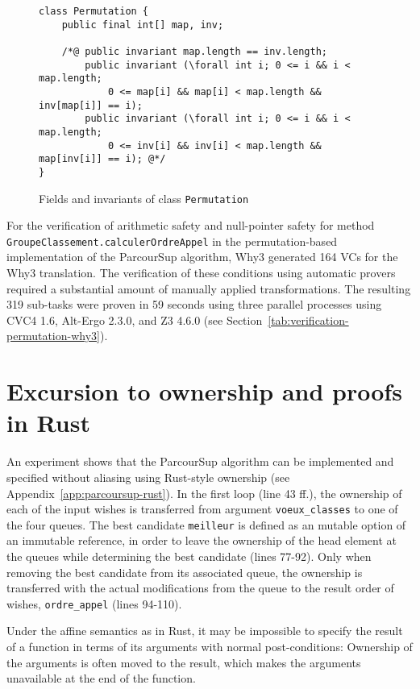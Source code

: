 \documentclass[a4paper]{report}
\newcommand{\cref}[1]{Section~\ref{#1}}
\newcommand{\aref}[1]{Appendix~\ref{#1}}
\begin{document}
\begin{figure}[tb]
  \begin{lstlisting}
class Permutation {
    public final int[] map, inv;

    /*@ public invariant map.length == inv.length;
        public invariant (\forall int i; 0 <= i && i < map.length;
            0 <= map[i] && map[i] < map.length && inv[map[i]] == i);
        public invariant (\forall int i; 0 <= i && i < map.length;
            0 <= inv[i] && inv[i] < map.length && map[inv[i]] == i); @*/
}
  \end{lstlisting}
  \caption{Fields and invariants of class \lstinline{Permutation}}
  \label{fig:permutation-class}
\end{figure}

For the verification of arithmetic safety and null-pointer safety for method
\lstinline{GroupeClassement.calculerOrdreAppel} in the permutation-based
implementation of the ParcourSup algorithm, Why3 generated 164 VCs for the Why3
translation. The verification of these conditions using automatic provers
required a substantial amount of manually applied transformations. The resulting
319 sub-tasks were proven in 59 seconds using three parallel processes using
CVC4 1.6, Alt-Ergo 2.3.0, and Z3 4.6.0 (see
\cref{tab:verification-permutation-why3}).

\section{Excursion to ownership and proofs in Rust}
\label{sec:rust}

An experiment shows that the ParcourSup algorithm can be implemented and
specified without aliasing using Rust-style ownership (see
\aref{app:parcoursup-rust}). In the first loop (line 43 ff.), the ownership of
each of the input wishes is transferred from argument \lstinline{voeux_classes}
to one of the four queues. The best candidate \lstinline{meilleur} is defined as
an mutable option of an immutable reference, in order to leave the ownership of
the head element at the queues while determining the best candidate (lines
77-92). Only when removing the best candidate from its associated queue, the
ownership is transferred with the actual modifications from the queue to the
result order of wishes, \lstinline{ordre_appel} (lines 94-110).

Under the affine semantics as in Rust, it may be impossible to specify the
result of a function in terms of its arguments with normal post-conditions:
Ownership of the arguments is often moved to the result, which makes the
arguments unavailable at the end of the function.
\end{document}
